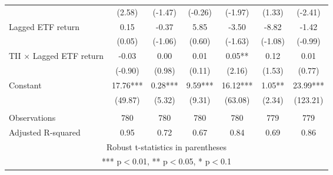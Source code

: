 \documentclass[]{article}
\begin{document}
\begin{tabular}{lcccccc}
 & (2.58) & (-1.47) & (-0.26) & (-1.97) & (1.33) & (-2.41) \\
Lagged ETF return & 0.15 & -0.37 & 5.85 & -3.50 & -8.82 & -1.42 \\
 & (0.05) & (-1.06) & (0.60) & (-1.63) & (-1.08) & (-0.99) \\
TII $\times$ Lagged ETF return & -0.03 & 0.00 & 0.01 & 0.05** & 0.12 & 0.01 \\
 & (-0.90) & (0.98) & (0.11) & (2.16) & (1.53) & (0.77) \\
Constant & 17.76*** & 0.28*** & 9.59*** & 16.12*** & 1.05** & 23.99*** \\
 & (49.87) & (5.32) & (9.31) & (63.08) & (2.34) & (123.21) \\
 &  &  &  &  &  &  \\
Observations & 780 & 780 & 780 & 780 & 779 & 779 \\
 Adjusted R-squared & 0.95 & 0.72 & 0.67 & 0.84 & 0.69 & 0.86 \\ \hline
\multicolumn{7}{c}{ Robust t-statistics in parentheses} \\
\multicolumn{7}{c}{ *** p$<$0.01, ** p$<$0.05, * p$<$0.1} \\
\end{tabular}
\end{document}
